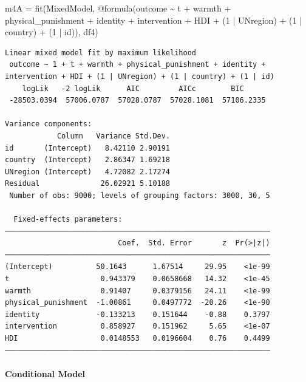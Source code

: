 \documentclass[
  letterpaper,
  DIV=11,
  numbers=noendperiod]{scrreprt}
\let\oldparagraph\paragraph
\renewcommand{\paragraph}[1]{\oldparagraph{#1}\mbox{}}
\newenvironment{Shaded}{\begin{snugshade}}{\end{snugshade}}
\newcommand{\FloatTok}[1]{\textcolor[rgb]{0.68,0.00,0.00}{#1}}
\newcommand{\FunctionTok}[1]{\textcolor[rgb]{0.28,0.35,0.67}{#1}}
\newcommand{\NormalTok}[1]{\textcolor[rgb]{0.00,0.23,0.31}{#1}}
\newcommand{\OperatorTok}[1]{\textcolor[rgb]{0.37,0.37,0.37}{#1}}
\newcommand{\PreprocessorTok}[1]{\textcolor[rgb]{0.68,0.00,0.00}{#1}}
\begin{document}
\begin{Shaded}
\begin{Highlighting}[]
\NormalTok{m4A }\OperatorTok{=} \FunctionTok{fit}\NormalTok{(MixedModel, }\PreprocessorTok{@formula}\NormalTok{(outcome }\OperatorTok{\textasciitilde{}}\NormalTok{ t }\OperatorTok{+}\NormalTok{ warmth }\OperatorTok{+} 
\NormalTok{                                  physical\_punishment }\OperatorTok{+} 
\NormalTok{                                  identity }\OperatorTok{+}\NormalTok{ intervention }\OperatorTok{+} 
\NormalTok{                                  HDI }\OperatorTok{+}
\NormalTok{                                  (}\FloatTok{1} \OperatorTok{|}\NormalTok{ UNregion) }\OperatorTok{+} 
\NormalTok{                                  (}\FloatTok{1} \OperatorTok{|}\NormalTok{ country) }\OperatorTok{+} 
\NormalTok{                                  (}\FloatTok{1} \OperatorTok{|}\NormalTok{ id)), df4)}
\end{Highlighting}
\end{Shaded}

\begin{verbatim}
Linear mixed model fit by maximum likelihood
 outcome ~ 1 + t + warmth + physical_punishment + identity + intervention + HDI + (1 | UNregion) + (1 | country) + (1 | id)
    logLik   -2 logLik      AIC         AICc        BIC     
 -28503.0394  57006.0787  57028.0787  57028.1081  57106.2335

Variance components:
            Column   Variance Std.Dev.
id       (Intercept)   8.42110 2.90191
country  (Intercept)   2.86347 1.69218
UNregion (Intercept)   4.72082 2.17274
Residual              26.02921 5.10188
 Number of obs: 9000; levels of grouping factors: 3000, 30, 5

  Fixed-effects parameters:
─────────────────────────────────────────────────────────────
                          Coef.  Std. Error       z  Pr(>|z|)
─────────────────────────────────────────────────────────────
(Intercept)          50.1643      1.67514     29.95    <1e-99
t                     0.943379    0.0658668   14.32    <1e-45
warmth                0.91407     0.0379156   24.11    <1e-99
physical_punishment  -1.00861     0.0497772  -20.26    <1e-90
identity             -0.133213    0.151644    -0.88    0.3797
intervention          0.858927    0.151962     5.65    <1e-07
HDI                   0.0148553   0.0196604    0.76    0.4499
─────────────────────────────────────────────────────────────
\end{verbatim}

\paragraph{Conditional Model}\label{conditional-model-2}
\end{document}
